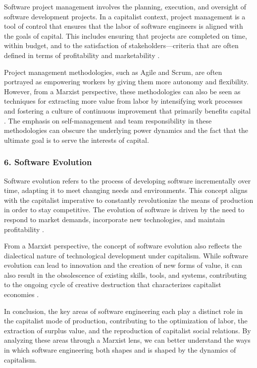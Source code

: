 \begin{refsection}
\begin{multicols}{2}
{Software project management involves the planning, execution, and oversight of software development projects. In a capitalist context, project management is a tool of control that ensures that the labor of software engineers is aligned with the goals of capital. This includes ensuring that projects are completed on time, within budget, and to the satisfaction of stakeholders—criteria that are often defined in terms of profitability and marketability \cite{marx1857grundrisse}.

Project management methodologies, such as Agile and Scrum, are often portrayed as empowering workers by giving them more autonomy and flexibility. However, from a Marxist perspective, these methodologies can also be seen as techniques for extracting more value from labor by intensifying work processes and fostering a culture of continuous improvement that primarily benefits capital \cite{fuchs2014digital}. The emphasis on self-management and team responsibility in these methodologies can obscure the underlying power dynamics and the fact that the ultimate goal is to serve the interests of capital.

\subsubsection*{6. Software Evolution}

Software evolution refers to the process of developing software incrementally over time, adapting it to meet changing needs and environments. This concept aligns with the capitalist imperative to constantly revolutionize the means of production in order to stay competitive. The evolution of software is driven by the need to respond to market demands, incorporate new technologies, and maintain profitability \cite{schiller1999digital}.

From a Marxist perspective, the concept of software evolution also reflects the dialectical nature of technological development under capitalism. While software evolution can lead to innovation and the creation of new forms of value, it can also result in the obsolescence of existing skills, tools, and systems, contributing to the ongoing cycle of creative destruction that characterizes capitalist economies \cite{marx1867capital}.

In conclusion, the key areas of software engineering each play a distinct role in the capitalist mode of production, contributing to the optimization of labor, the extraction of surplus value, and the reproduction of capitalist social relations. By analyzing these areas through a Marxist lens, we can better understand the ways in which software engineering both shapes and is shaped by the dynamics of capitalism.
}


\end{multicols}
\end{refsection}
